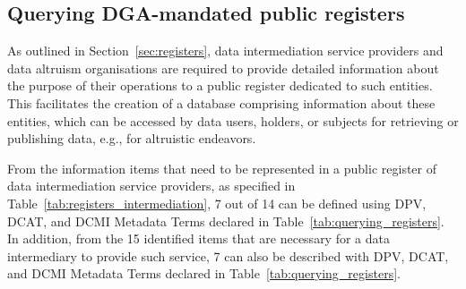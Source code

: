\subsection{Querying DGA-mandated public registers}
\label{sec:dga_registers}

As outlined in Section~\ref{sec:registers}, data intermediation service providers and data altruism organisations are required to provide detailed information about the purpose of their operations to a public register dedicated to such entities. 
This facilitates the creation of a database comprising information about these entities, which can be accessed by data users, holders, or subjects for retrieving or publishing data, e.g., for altruistic endeavors.

From the information items that need to be represented in a public register of data intermediation service providers, as specified in Table~\ref{tab:registers_intermediation}, 7 out of 14 can be defined using DPV, DCAT, and DCMI Metadata Terms declared in Table~\ref{tab:querying_registers}.
In addition, from the 15 identified items that are necessary for a data intermediary to provide such service, 7 can also be described with DPV, DCAT, and DCMI Metadata Terms declared in Table~\ref{tab:querying_registers}.

